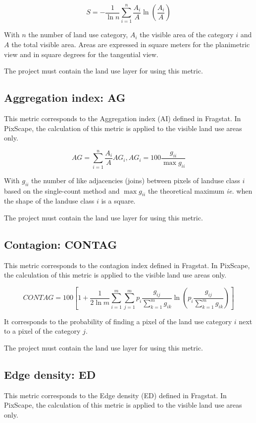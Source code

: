 \documentclass{report}
\begin{document}
$$S = -\frac{1}{\ln n}\sum_{i=1}^{n}\frac{A_i}{A}\ln\left(\frac{A_i}{A}\right)$$

With $n$ the number of land use category, $A_i$ the visible area of the category $i$ and $A$ the total visible area. Areas are expressed in square meters for the planimetric view and in square degrees for the tangential view.

The project must contain the land use layer for using this metric.

\subsection{Aggregation index: AG}
This metric corresponds to the Aggregation index (AI) defined in Fragstat. In PixScape, the calculation of this metric is applied to the visible land use areas only.

$$AG = \sum_{i=1}^n \frac{A_i}{A} AG_i, AG_i = 100 \frac{g_{ii}}{\max g_{ii}}$$

With $g_{ii}$ the number of like adjacencies (joins) between pixels of landuse class $i$ based on the single-count method and $\max g_{ii}$ the theoretical maximum \textit{ie.} when the shape of the landuse class $i$ is a square.

The project must contain the land use layer for using this metric.

\subsection{Contagion: CONTAG}
This metric corresponds to the contagion index defined in Fragstat. In PixScape, the calculation of this metric is applied to the visible land use areas only.

$$ CONTAG = 100 \left[1+\dfrac{1}{2\ln m} \sum _{i=1}^{m}  \sum _{j=1}^{m}  p_i\dfrac{g_{ij}}{\sum _{k=1}^{m}g_{ik} }   \ln \left( p_i\dfrac{g_{ij}}{\sum _{k=1}^{m}g_{ik} }\right)  \right]$$

It corresponds to the probability of finding a pixel of the land use category $i$
next to a pixel of the category $j$.

The project must contain the land use layer for using this metric.

\subsection{Edge density: ED}
This metric corresponds to the Edge density (ED) defined in Fragstat. In PixScape, the calculation of this metric is applied to the visible land use areas only.
\end{document}
